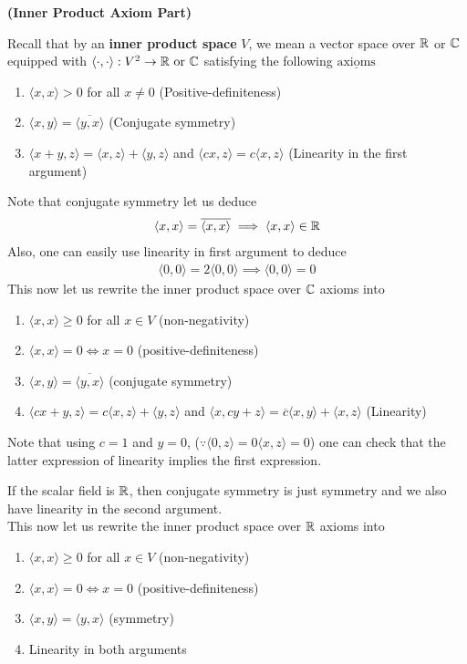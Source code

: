 \documentclass{report}
\begin{document}
\textbf{(Inner Product Axiom Part)}
\begin{mdframed}
Recall that by an \textbf{inner product space} $V$, we mean a vector space over  $\mathbb{R}$ or $\mathbb{C}$ equipped with  $\langle \cdot,\cdot\rangle : V^2 \rightarrow \mathbb{R}\text{ or }\mathbb{C}$ satisfying the following $\underline{\text{axioms}}$
\begin{enumerate}[label=(\alph*)]
  \item $\langle x,x\rangle >0$ for all $x\neq 0$ (Positive-definiteness)
  \item $\langle x,y\rangle =\overline{\langle y,x\rangle }$ (Conjugate symmetry)
  \item $\langle x+y,z\rangle =\langle x,z\rangle +\langle y,z\rangle $ and $\langle cx,z\rangle=c\langle x,z\rangle $ (Linearity in the first argument)
\end{enumerate}
Note that conjugate symmetry let us deduce
\begin{align*}
\langle x,x\rangle =\overline{\langle x,x\rangle }\implies \langle x,x\rangle \in\mathbb{R}
\end{align*}
Also, one can easily use linearity in first argument to deduce 
\begin{align*}
\langle 0,0\rangle =2\langle 0,0\rangle \implies \langle 0,0\rangle =0
\end{align*}
This now let us rewrite the inner product space over $\mathbb{C}$ axioms into 
\begin{enumerate}[label=(\alph*)]
  \item $\langle x,x\rangle \geq 0$ for all $x\in V$ (non-negativity) 
  \item $\langle x,x\rangle =0 \iff x=0$ (positive-definiteness)
  \item $\langle x,y\rangle =\overline{\langle y,x\rangle }$ (conjugate symmetry)
  \item $\langle cx+y,z\rangle =c\langle x,z\rangle +\langle y,z\rangle $ and $\langle x,cy+z\rangle =\overline{c}\langle x,y\rangle +\langle x,z\rangle $ (Linearity)
\end{enumerate}
Note that using $c=1$ and $y=0$, ($\because \langle 0,z\rangle =0\langle x,z\rangle=0 $) one can check that the latter expression of linearity implies the first expression.
\end{mdframed}
\begin{mdframed}
If the scalar field is $\mathbb{R}$, then conjugate symmetry is just symmetry and we also have linearity in the second argument.\\

This now let us rewrite the inner product space over $\mathbb{R}$ axioms into 
\begin{enumerate}[label=(\alph*)]
  \item $\langle x,x\rangle \geq 0$ for all $x\in V$ (non-negativity) 
  \item $\langle x,x\rangle =0 \iff x=0$ (positive-definiteness)
  \item $\langle x,y\rangle =\langle y,x\rangle $ (symmetry)
  \item Linearity in both arguments
\end{enumerate}
\end{mdframed}
\end{document}
